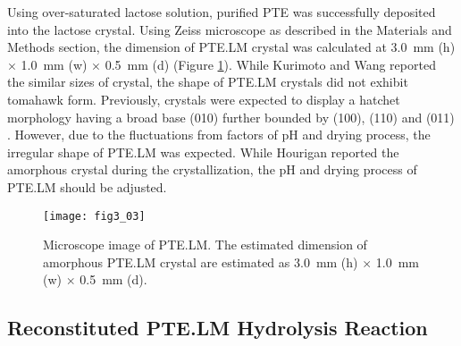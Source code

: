 \begin{refsection}
Using over-saturated lactose solution, purified PTE was successfully deposited
into the lactose crystal. Using Zeiss microscope as described in the Materials
and Methods section, the dimension of PTE.LM crystal was calculated at
\SI{3.0}{\mm} (h) $\times$ \SI{1.0}{\mm} (w) $\times$ \SI{0.5}{\mm} (d) (Figure
\ref{fig:ptelm-image}). While Kurimoto  and Wang 
reported the similar sizes of crystal, the shape of PTE.LM crystals did not
exhibit tomahawk form. Previously, crystals were expected to display a hatchet
morphology having a broad base (010) further bounded by (100), (110) and (011)
\cite{Kurimoto1999}.  However, due to the fluctuations from factors of pH and
drying process, the irregular shape of PTE.LM was expected. While Hourigan
 reported the amorphous crystal during the crystallization, the
pH and drying process of PTE.LM should be adjusted. 
\begin{figure}[h!] \centering \texttt{[image: fig3\_03]} 
    \caption[Microscope image of PTE.LM. The estimated dimension of amorphous
    PTE.LM crystal are estimated as  \SI{3.0}{\mm} (h) $\times$ \SI{1.0}{\mm}
(w) $\times$ \SI{0.5}{\mm} (d).]{Microscope image of PTE.LM. The estimated
    dimension of amorphous PTE.LM crystal are estimated as  \SI{3.0}{\mm} (h)
    $\times$ \SI{1.0}{\mm} (w) $\times$ \SI{0.5}{\mm} (d).}
    \label{fig:ptelm-image} 
\end{figure}

\subsection{Reconstituted PTE.LM Hydrolysis Reaction}


\end{refsection}
